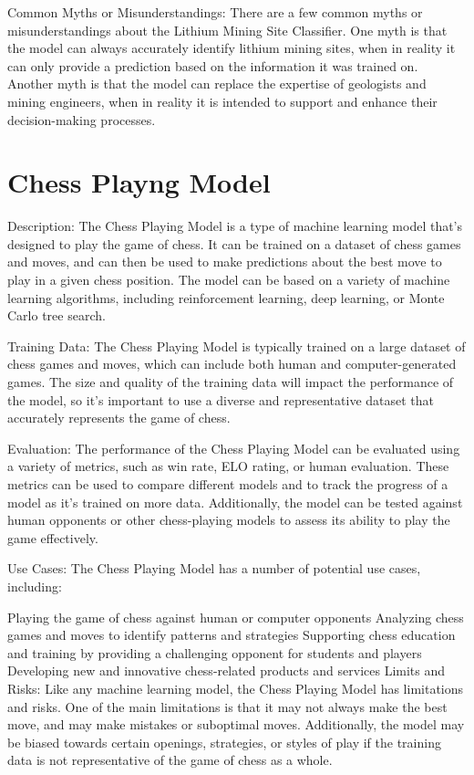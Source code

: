 Common Myths or Misunderstandings:
There are a few common myths or misunderstandings about the Lithium Mining Site Classifier. One myth is that the model can always accurately identify lithium mining sites, when in reality it can only provide a prediction based on the information it was trained on. Another myth is that the model can replace the expertise of geologists and mining engineers, when in reality it is intended to support and enhance their decision-making processes.

\section{Chess Playng Model}

Description:
The Chess Playing Model is a type of machine learning model that's designed to play the game of chess. It can be trained on a dataset of chess games and moves, and can then be used to make predictions about the best move to play in a given chess position. The model can be based on a variety of machine learning algorithms, including reinforcement learning, deep learning, or Monte Carlo tree search.

Training Data:
The Chess Playing Model is typically trained on a large dataset of chess games and moves, which can include both human and computer-generated games. The size and quality of the training data will impact the performance of the model, so it's important to use a diverse and representative dataset that accurately represents the game of chess.

Evaluation:
The performance of the Chess Playing Model can be evaluated using a variety of metrics, such as win rate, ELO rating, or human evaluation. These metrics can be used to compare different models and to track the progress of a model as it's trained on more data. Additionally, the model can be tested against human opponents or other chess-playing models to assess its ability to play the game effectively.

Use Cases:
The Chess Playing Model has a number of potential use cases, including:

Playing the game of chess against human or computer opponents
Analyzing chess games and moves to identify patterns and strategies
Supporting chess education and training by providing a challenging opponent for students and players
Developing new and innovative chess-related products and services
Limits and Risks:
Like any machine learning model, the Chess Playing Model has limitations and risks. One of the main limitations is that it may not always make the best move, and may make mistakes or suboptimal moves. Additionally, the model may be biased towards certain openings, strategies, or styles of play if the training data is not representative of the game of chess as a whole.


